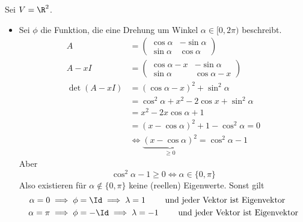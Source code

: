 \documentclass[a4paper, 10pt]{scrbook}
\begin{document}
\begin{ex}
Sei $V=\R^2$.
\begin{itemize}
\item
 Sei $\phi$ die Funktion, die eine Drehung um Winkel $\alpha \in [0,2\pi)$ beschreibt.
\begin{align*}
A&=\begin{pmatrix}\cos \alpha & -\sin\alpha\\ \sin \alpha &\cos \alpha\end{pmatrix}\\
A-x I&=\begin{pmatrix}\cos \alpha -x  & -\sin\alpha\\ \sin \alpha &\cos \alpha -x\end{pmatrix}\\
\det(A-xI)&=(\cos \alpha -x)^2+\sin^2\alpha\\
&=\cos^2\alpha +x^2-2\cos x+\sin^2 \alpha\\
&=x^2-2x\cos \alpha + 1\\
&=(x-\cos\alpha)^2+1-\cos^2\alpha=0\\
&\iff \underbrace{(x-\cos \alpha)^2}_{\ge 0}=\cos^2\alpha - 1
\end{align*}
Aber
\[
\cos^2\alpha-1\ge 0 \iff \alpha\in\{0,\pi\}
\]
Also existieren für $\alpha\not\in\{0,\pi\}$ keine (reellen) Eigenwerte.
Sonst gilt
\begin{align*}
\alpha=0&\implies \phi=\Id \implies \lambda=1 \qquad \text{ und jeder Vektor ist Eigenvektor} \\
\alpha=\pi&\implies \phi=-\Id \implies \lambda=-1 \qquad \text{ und jeder Vektor ist Eigenvektor}
\end{align*}


\end{itemize}
\end{ex}
\end{document}
